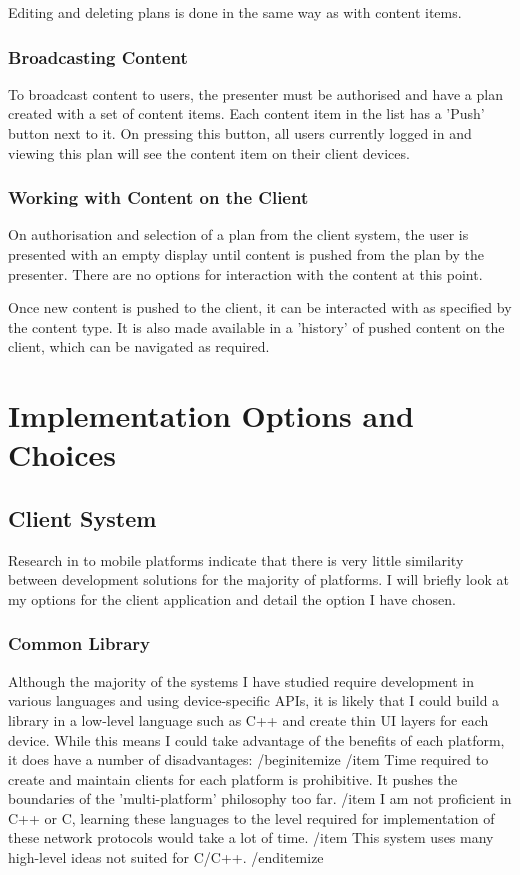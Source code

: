 \documentclass[a4papert,11pt,notitlepage]{ltxdoc}
\begin{document}
Editing and deleting plans is done in the same way as with content items.

\subsubsection{Broadcasting Content}
To broadcast content to users, the presenter must be authorised and have a plan created with a set of content items. Each content item in the list has a 'Push' button next to it. On pressing this button, all users currently logged in and viewing this plan will see the content item on their client devices.

\subsubsection{Working with Content on the Client}
On authorisation and selection of a plan from the client system, the user is presented with an empty display until content is pushed from the plan by the presenter. There are no options for interaction with the content at this point.

Once new content is pushed to the client, it can be interacted with as specified by the content type. It is also made available in a 'history' of pushed content on the client, which can be navigated as required.

\section{Implementation Options and Choices}
\subsection{Client System}
Research in to mobile platforms indicate that there is very little similarity between development solutions for the majority of platforms. I will briefly look at my options for the client application and detail the option I have chosen.

\subsubsection{Common Library}
Although the majority of the systems I have studied require development in various languages and using device-specific APIs, it is likely that I could build a library in a low-level language such as C++ and create thin UI layers for each device. While this means I could take advantage of the benefits of each platform, it does have a number of disadvantages:
/begin{itemize}
/item Time required to create and maintain clients for each platform is prohibitive. It pushes the boundaries of the 'multi-platform' philosophy too far.
/item I am not proficient in C++ or C, learning these languages to the level required for implementation of these network protocols would take a lot of time.
/item This system uses many high-level ideas not suited for C/C++.
/end{itemize}
\end{document}
